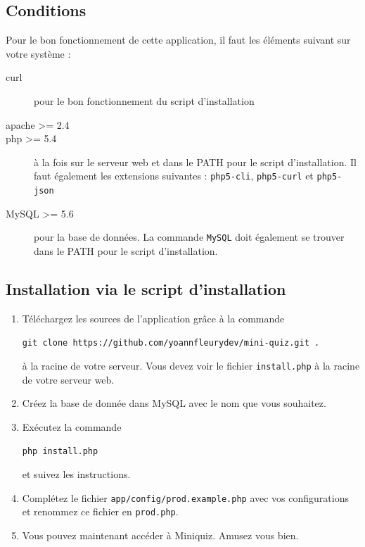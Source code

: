 \documentclass[12pt]{article}
\begin{document}
    \subsection{Conditions} Pour le bon fonctionnement de cette application, il faut les éléments suivant sur votre système :
    \begin{description}
        \item[curl] pour le bon fonctionnement du script d'installation
        \item[apache >= 2.4]
        \item[php >= 5.4] à la fois sur le serveur web et dans le PATH pour le script d'installation. Il faut également les extensions suivantes : \texttt{php5-cli}, \texttt{php5-curl} et \texttt{php5-json}
        \item[MySQL >= 5.6] pour la base de données. La commande \texttt{MySQL} doit également se trouver dans le PATH pour le script d'installation.
    \end{description}
    
    \subsection{Installation via le script d'installation}
    \begin{enumerate}
        \item Téléchargez les sources de l'application grâce à la commande
        \begin{center}
            \texttt{git  clone https://github.com/yoannfleurydev/mini-quiz.git .}\\
        \end{center} 
        à la racine de votre serveur. Vous devez voir le fichier \texttt{install.php} à la racine de votre serveur web.
        \item Créez la base de donnée dans MySQL avec le nom que vous souhaitez. 
        \item Exécutez la commande  
        \begin{center}
            \texttt{php install.php}\\
        \end{center}
        et suivez les instructions.
        \item Complétez le fichier \texttt{app/config/prod.example.php} avec vos configurations et renommez ce fichier en \texttt{prod.php}.
        \item Vous pouvez maintenant accéder à Miniquiz. Amusez vous bien.
    \end{enumerate}
    
\end{document}
